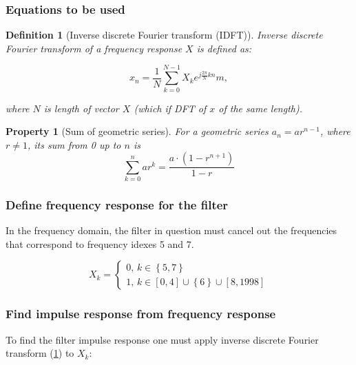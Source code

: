 \documentclass[a4paper]{article}
\theoremstyle{break}
\newtheorem{definition}{Definition}[section]
\theoremstyle{break}
\newtheorem{property}{Property}[section]
\begin{document}
\subsubsection*{Equations to be used}

\begin{definition}[Inverse discrete Fourier transform (IDFT)] \label{def:idft}
  Inverse discrete Fourier transform of a frequency response $X$ is defined as:

  \begin{equation} \label{eq:idft}
    x_n = \frac{1}{N} \sum_{k=0}^{N - 1} X_k e^{j \frac{2 \pi }{N} k n}m,
  \end{equation}

  where $N$ is length of vector $X$ (which if DFT of $x$ of the same length).
\end{definition}

\begin{property}[Sum of geometric series]
  For a geometric series $a_{n} = a r^{n - 1}$, where $r \neq 1$, its sum from 0 up to $n$ is
  \begin{equation} \label{eq:geom_sum}
    \sum_{k=0}^{n} a r^{k} = \frac{a \cdot \left( 1 - r^{n + 1} \right)}{1 - r}
  \end{equation}
\end{property}

\subsubsection*{Define frequency response for the filter}

In the frequency domain, the filter in question must cancel out the frequencies that correspond to frequency idexes 5 and 7.

\begin{equation*}
  X_k = \begin{cases}
          0, \, k \in \left\{ 5, 7 \right\} \\
          1, \, k \in [0, 4] \cup \left\{ 6 \right\} \cup [8, 1998]
        \end{cases}
\end{equation*}

\subsubsection*{Find impulse response from frequency response}

To find the filter impulse response one must apply inverse discrete Fourier transform (\ref{def:idft}) to $X_k$:
\end{document}
